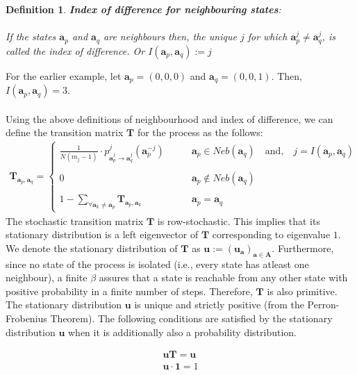 \documentclass[11pt]{article}
\theoremstyle{plainCl1}
\newtheorem{definition}{Definition}
\theoremstyle{plainCl2}
\newcommand{\A}{\mathbf{A}}
\newcommand{\abf}{\mathbf{a}}
\newcommand{\T}{\mathbf{T}}
\newcommand{\ubf}{\mathbf{u}}
\begin{document}
\begin{definition}
\textbf{Index of difference for neighbouring states}: \\ \\ If the states $\abf_p$ and $\abf_q$ are neighbours then, the unique $j$ for which $\abf_p^{j} \neq \abf_q^{j}$, is called the index of difference. Or $I(\abf_p,\abf_q) := j$
\label{Def:index-of-difference}
\end{definition}
\noindent For the earlier example, let $\abf_p = (\mathit{0}, \mathit{0}, \mathit{0})$ and $\abf_q = (\mathit{0}, \mathit{0}, \mathit{1})$. Then, $I(\abf_p,\abf_q) = 3$. 
\\ \\ 
Using the above definitions of neighbourhood and index of difference, we can define the transition matrix $\T$ for the process as the follows: 
\begin{align}
\T_{\abf_p,\abf_q} = 
\begin{cases}
\frac{1}{N(m_j-1)}  \cdot p^j_{\abf^j_p \to \abf^j_q} (\abf_p^{-j}) \quad  \quad &\abf_p \in \mathit{Neb}(\abf_q) \quad \text{and,} \quad j = I(\abf_p,\abf_q)\\ \\ 
0 \quad & \abf_{p} \notin \mathit{Neb}(\abf_q) \\ \\
1 - \sum_{\forall \abf_k \neq \abf_p} \T_{\abf_p,\abf_k} \quad &\abf_p = \abf_q
\end{cases}
\label{Eq:transition-matrix}
\end{align}
\noindent The stochastic transition matrix $\T$ is row-stochastic. This implies that its stationary distribution is a left eigenvector of $\T$ corresponding to eigenvalue $1$. We denote the stationary distribution of $\T$ as $\ubf := (\ubf_{\abf})_{\abf \in \A}$. Furthermore, since no state of the process is isolated (i.e., every state has atleast one neighbour), a finite $\beta$ assures that a state is reachable from any other state with positive probability in a finite number of steps. Therefore, $\T$ is also primitive. The stationary distribution $\ubf$ is unique and strictly positive (from the Perron-Frobenius Theorem). The following conditions are satisfied by the stationary distribution $\ubf$ when it is additionally also a probability distribution. 

\begin{eqnarray}
\label{Eq:lefteigenvector}
\ubf \T = \ubf \\ 
\label{Eq:normalizationcondition}
\ubf \cdot \mathbf{1} = 1
\end{eqnarray}
\end{document}
